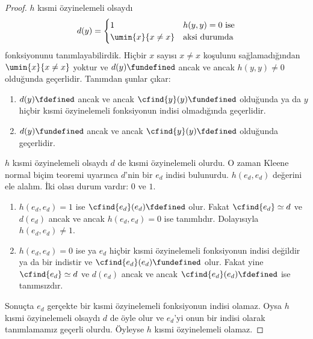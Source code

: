 \begin{proof}
$h$ kısmi özyinelemeli olsaydı
\[
  d(y)=\begin{cases}
    1 & \text{$h(y,y)=0$ ise}\\
    \umin{x}{x\neq x} & \text{aksi durumda}
  \end{cases}
\]
fonksiyonunu tanımlayabilirdik. Hiçbir $x$ sayısı $x\neq x$ koşulunu
sağlamadığından $\umin{x}{x\neq x}$ yoktur ve
$d(y)\fundefined$ ancak ve ancak $h(y,y)\neq0$ olduğunda geçerlidir.
Tanımdan şunlar çıkar:
\begin{enumerate}
\item $d(y)\fdefined$ ancak ve ancak $\cfind{y}(y)\fundefined$ olduğunda ya
  da $y$ hiçbir kısmi özyinelemeli fonksiyonun indisi olmadığında geçerlidir.
\item $d(y)\fundefined$ ancak ve ancak $\cfind{y}(y)\fdefined$ olduğunda
  geçerlidir.
\end{enumerate}
$h$ kısmi özyinelemeli olsaydı $d$ de kısmi özyinelemeli olurdu. O zaman
Kleene normal biçim teoremi uyarınca $d$'nin bir $e_d$ indisi bulunurdu.
$h(e_d,e_d)$ değerini ele alalım. İki olası durum vardır: $0$ ve $1$.
\begin{enumerate}
\item $h(e_d,e_d)=1$ ise $\cfind{e_d}(e_d)\fdefined$ olur. Fakat
  $\cfind{e_d}\simeq d$ ve $d(e_d)$ ancak ve ancak $h(e_d,e_d)=0$ ise
  tanımlıdır. Dolayısıyla $h(e_d,e_d)\neq1$.
\item $h(e_d,e_d)=0$ ise ya $e_d$ hiçbir kısmi özyinelemeli fonksiyonun
  indisi değildir ya da bir indistir ve $\cfind{e_d}(e_d)\fundefined$ olur.
  Fakat yine $\cfind{e_d}\simeq d$ ve $d(e_d)$ ancak ve ancak
  $\cfind{e_d}(e_d)\fdefined$ ise tanımsızdır.
\end{enumerate}
Sonuçta $e_d$ gerçekte bir kısmi özyinelemeli fonksiyonun indisi olamaz.
Oysa $h$ kısmi özyinelemeli olsaydı $d$ de öyle olur ve $e_d$'yi onun bir
indisi olarak tanımlamamız geçerli olurdu. Öyleyse $h$ kısmi özyinelemeli
olamaz.
\end{proof}

